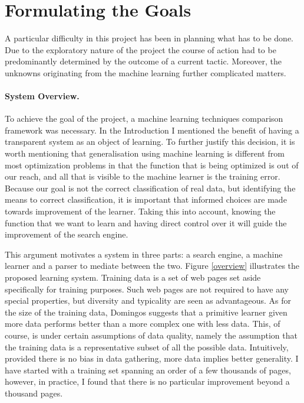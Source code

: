 \documentclass[12pt,twoside,notitlepage]{report}
\begin{document}
\section{Formulating the Goals}
A particular difficulty in this project has been in planning what has to be
done. Due to the exploratory nature of the project the course of action had to
be predominantly determined by the outcome of a current tactic. Moreover, the
unknowns originating from the machine learning further complicated matters. 

\paragraph{System Overview.}

To achieve the goal of the project, a machine learning techniques comparison
framework was necessary. In the Introduction I mentioned the benefit of having
a transparent system as an object of learning. To further justify this
decision, it is worth mentioning that  generalisation using machine learning is
different from most optimization problems in that the function that is being
optimized is out of our reach, and all that is visible to the machine learner
is the training error. Because our goal is not the correct classification of
real data, but identifying the means to correct classification, it is important
that informed choices are made towards improvement of the learner. Taking this
into account, knowing the function that we want to learn and having direct
control over it  will guide the improvement of the search engine. 

This argument motivates a system in three parts: a search engine, a machine
learner and a parser to mediate between the two.
Figure \ref{overview} illustrates the proposed learning system. Training data
is a set of web pages set aside specifically for training purposes. Such web
pages are not required to have any special properties, but diversity and
typicality are seen as advantageous. As for the size of the training data, 
Domingos \cite{domingos} suggests that a primitive learner given more data
performs better than a more complex one with less data. This, of course, is
under certain assumptions of data quality, namely the assumption that the
training data is a representative subset of all the possible data. Intuitively,
provided there is no bias in data gathering, more data implies better
generality. I have started with a training set spanning an order of a few
thousands of pages, however, in practice, I found that there is no
particular improvement beyond a thousand pages. 
\end{document}
